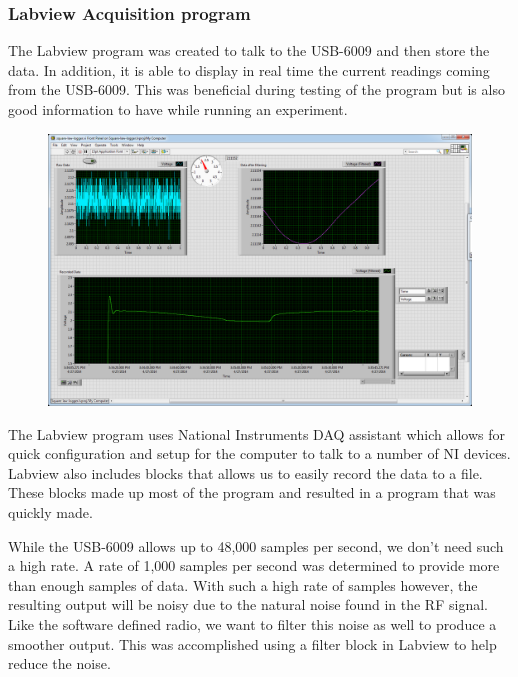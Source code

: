 \subsubsection{Labview Acquisition program}

The Labview program was created to talk to the USB-6009 and then store the data.  In addition, it is able to display in real time the current readings coming from the USB-6009.  This was beneficial during testing of the program but is also good information to have while running an experiment.  

{\begin{figure}[h!tb] \centering
\includegraphics[width=\textwidth]{Images/labviewGUI.png}
\label{labviewgui}
\end{figure}
}

The Labview program uses National Instruments DAQ assistant which allows for quick configuration and setup for the computer to talk to a number of NI devices.  Labview also includes blocks that allows us to easily record the data to a file.  These blocks made up most of the program and resulted in a program that was quickly made.  

While the USB-6009 allows up to 48,000 samples per second, we don't need such a high rate.  A rate of 1,000 samples per second was determined to provide more than enough samples of data.  With such a high rate of samples however, the resulting output will be noisy due to the natural noise found in the RF signal.  Like the software defined radio, we want to filter this noise as well to produce a smoother output.  This was accomplished using a filter block in Labview to help reduce the noise.

